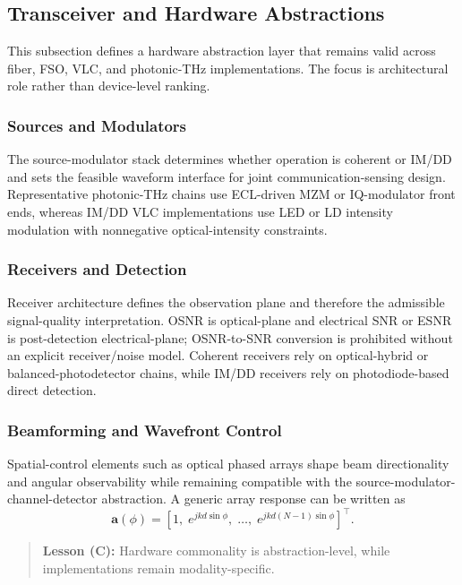 \subsection{Transceiver and Hardware Abstractions}
This subsection defines a hardware abstraction layer that remains valid across fiber, FSO, VLC, and photonic-THz implementations. The focus is architectural role rather than device-level ranking.

\subsubsection{Sources and Modulators}
The source-modulator stack determines whether operation is coherent or IM/DD and sets the feasible waveform interface for joint communication-sensing design. Representative photonic-THz chains use ECL-driven MZM or IQ-modulator front ends, whereas IM/DD VLC implementations use LED or LD intensity modulation with nonnegative optical-intensity constraints.

\subsubsection{Receivers and Detection}
Receiver architecture defines the observation plane and therefore the admissible signal-quality interpretation. OSNR is optical-plane and electrical SNR or ESNR is post-detection electrical-plane; OSNR-to-SNR conversion is prohibited without an explicit receiver/noise model. Coherent receivers rely on optical-hybrid or balanced-photodetector chains, while IM/DD receivers rely on photodiode-based direct detection.

\subsubsection{Beamforming and Wavefront Control}
Spatial-control elements such as optical phased arrays shape beam directionality and angular observability while remaining compatible with the source-modulator-channel-detector abstraction. A generic array response can be written as
\begin{equation}
\mathbf{a}(\phi)=\left[1,\;e^{jkd\sin\phi},\;\ldots,\;e^{jkd(N-1)\sin\phi}\right]^{\top}.
\end{equation}

\begin{quote}
\textbf{Lesson (C):} Hardware commonality is abstraction-level, while implementations remain modality-specific.
\end{quote}


